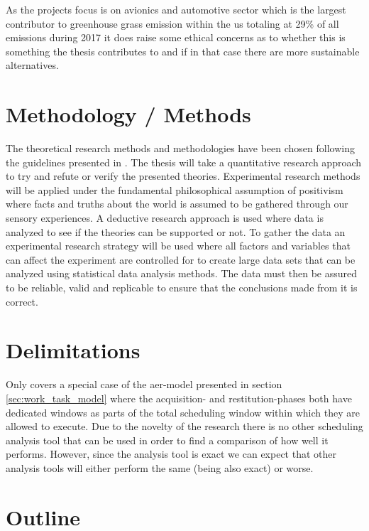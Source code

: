 \documentclass{kththesis}
\begin{document}
As the projects focus is on avionics and automotive sector which is the largest contributor to
greenhouse grass emission within the \acrshort{us} totaling at 29\% of all emissions during
2017\parencite{us_epa_inventory_2017} it does raise some ethical concerns as to whether this is
something the thesis contributes to and if in that case there are more sustainable alternatives.

\section{Methodology / Methods}

The theoretical research methods and methodologies have been chosen following the guidelines
presented in \textcite{hakansson_portal_2013}. The thesis will take a quantitative research approach
to try and refute or verify the presented theories. Experimental research methods will be applied
under the fundamental philosophical assumption of positivism where facts and truths about the world
is assumed to be gathered through our sensory experiences. A deductive research approach is used
where data is analyzed to see if the theories can be supported or not. To gather the data an
experimental research strategy will be used where all factors and variables that can affect the
experiment are controlled for to create large data sets that can be analyzed using statistical data
analysis methods. The data must then be assured to be reliable, valid and replicable to ensure that
the conclusions made from it is correct.


\section{Delimitations}

Only covers a special case of the \acrshort{aer}-model presented in section
\ref{sec:work_task_model} where the acquisition- and restitution-phases both have dedicated windows
as parts of the total scheduling window within which they are allowed to execute. Due to the novelty
of the research there is no other scheduling analysis tool that can be used in order to find a
comparison of how well it performs. However, since the analysis tool is exact we can expect that
other analysis tools will either perform the same (being also exact) or worse.


\section{Outline}
\end{document}
